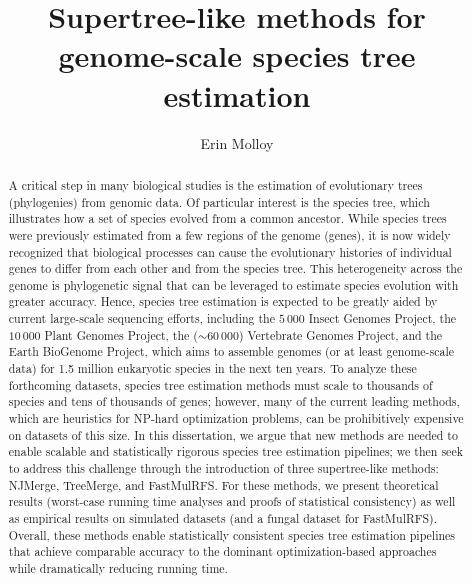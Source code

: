 \documentclass[tocnosub, noragright, centerchapter, fullpagesingle, 12pt]{uiuc_csthesis18}
\title{Supertree-like methods for genome-scale species tree estimation}
\author{Erin Molloy}
\numberwithin{algocf}{chapter}
\theoremstyle{definition}
\begin{document}
%

%
\maketitle


\frontmatter

%
\begin{abstract}
A critical step in many biological studies is the estimation of evolutionary trees (phylogenies) from genomic data.
Of particular interest is the species tree, which illustrates how a set of species evolved from a common ancestor.
While species trees were previously estimated from a few regions of the genome (genes), it is now widely recognized that biological processes can cause the evolutionary histories of individual genes to differ from each other and from the species tree.
This heterogeneity across the genome is phylogenetic signal that can be leveraged to estimate species evolution with greater accuracy.
Hence, species tree estimation is expected to be greatly aided by current large-scale sequencing efforts, including the $5\,000$ Insect Genomes Project, the $10\,000$ Plant Genomes Project, the ($\sim$$60\,000$) Vertebrate Genomes Project, and the Earth BioGenome Project, which aims to assemble genomes (or at least genome-scale data) for 1.5 million eukaryotic species in the next ten years.
To analyze these forthcoming datasets, species tree estimation methods must scale to thousands of species and tens of thousands of genes; however, many of the current leading methods, which are heuristics for NP-hard optimization problems, can be prohibitively expensive on datasets of this size.
In this dissertation, we argue that new methods are needed to enable scalable and statistically rigorous species tree estimation pipelines; we then seek to address this challenge through the introduction of three supertree-like methods: NJMerge, TreeMerge, and FastMulRFS. 
For these methods, we present theoretical results (worst-case running time analyses and proofs of statistical consistency) as well as empirical results on simulated  datasets (and a fungal dataset for FastMulRFS).
Overall, these methods enable statistically consistent species tree estimation pipelines  that achieve comparable accuracy to the dominant optimization-based approaches while dramatically reducing running time.
\end{abstract}
\end{document}
